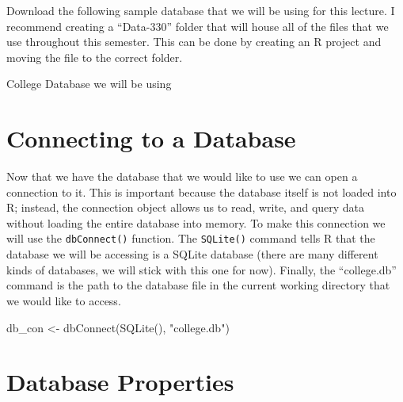 \documentclass[
  letterpaper,
  DIV=11,
  numbers=noendperiod]{scrreprt}
\newenvironment{Shaded}{\begin{snugshade}}{\end{snugshade}}
\newcommand{\FunctionTok}[1]{\textcolor[rgb]{0.28,0.35,0.67}{#1}}
\newcommand{\NormalTok}[1]{\textcolor[rgb]{0.00,0.23,0.31}{#1}}
\newcommand{\OtherTok}[1]{\textcolor[rgb]{0.00,0.23,0.31}{#1}}
\newcommand{\StringTok}[1]{\textcolor[rgb]{0.13,0.47,0.30}{#1}}
\begin{document}
Download the following sample database that we will be using for this
lecture. I recommend creating a ``Data-330'' folder that will house all
of the files that we use throughout this semester. This can be done by
creating an R project and moving the file to the correct folder.

\begin{tcolorbox}[enhanced jigsaw, breakable, toptitle=1mm, leftrule=.75mm, arc=.35mm, titlerule=0mm, opacitybacktitle=0.6, colframe=quarto-callout-tip-color-frame, colback=white, opacityback=0, coltitle=black, bottomtitle=1mm, bottomrule=.15mm, left=2mm, colbacktitle=quarto-callout-tip-color!10!white, rightrule=.15mm, title=\textcolor{quarto-callout-tip-color}{\faLightbulb}\hspace{0.5em}{Supplemental Material}, toprule=.15mm]

College Database we will be using

\end{tcolorbox}

\section{Connecting to a Database}\label{connecting-to-a-database}

Now that we have the database that we would like to use we can open a
connection to it. This is important because the database itself is not
loaded into R; instead, the connection object allows us to read, write,
and query data without loading the entire database into memory. To make
this connection we will use the \texttt{dbConnect()} function. The
\texttt{SQLite()} command tells R that the database we will be accessing
is a SQLite database (there are many different kinds of databases, we
will stick with this one for now). Finally, the ``college.db'' command
is the path to the database file in the current working directory that
we would like to access.

\begin{Shaded}
\begin{Highlighting}[]
\NormalTok{db\_con }\OtherTok{\textless{}{-}} \FunctionTok{dbConnect}\NormalTok{(}\FunctionTok{SQLite}\NormalTok{(), }\StringTok{"college.db"}\NormalTok{)}
\end{Highlighting}
\end{Shaded}

\section{Database Properties}\label{database-properties}
\end{document}
